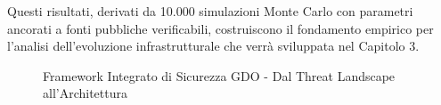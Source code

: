 Questi risultati, derivati da 10.000 simulazioni Monte Carlo con parametri ancorati a fonti pubbliche verificabili, costruiscono il fondamento empirico per l'analisi dell'evoluzione infrastrutturale che verrà sviluppata nel Capitolo 3.

\begin{figure}[H]
\centering
{}
\caption{Framework Integrato di Sicurezza GDO - Dal Threat Landscape all'Architettura}
\end{figure}
